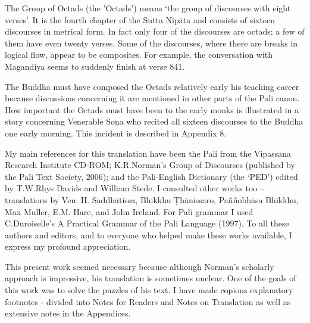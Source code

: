 
The Group of Octads (the 'Octads') means ‘the group of discourses with eight verses’. It is the fourth chapter of the Sutta Nipāta and consists of sixteen discourses in metrical form. In fact only four of the discourses are octads; a few of them have even twenty verses. Some of the discourses, where there are breaks in logical flow, appear to be composites. For example, the conversation with Magandiya seems to suddenly finish at verse 841. 

The Buddha must have composed the Octads relatively early his teaching career because discussions concerning it are mentioned in other parts of the Pali canon. How important the Octads must have been to the early monks is illustrated in a story concerning Venerable Soṇa who recited all sixteen discourses to the Buddha one early morning. This incident is described in Appendix 8.

My main references for this translation have been the Pali from the Vipassana Research Institute CD-ROM; K.R.Norman’s Group of Discourses (published by the Pali Text Society, 2006); and the Pali-English Dictionary (the ‘PED’) edited by T.W.Rhys Davids and William Stede. I consulted other works too – translations by Ven. H. Saddhātissa, Bhikkhu Ṭhānissaro, Paññobhāsa Bhikkhu, Max Muller, E.M. Hare, and John Ireland. For Pali grammar I used C.Duroiselle’s A Practical Grammar of the Pali Language (1997). To all these authors and editors, and to everyone who helped make these works available, I express my profound appreciation.

This present work seemed necessary because although Norman’s scholarly approach is impressive, his translation is sometimes unclear. One of the goals of this work was to solve the puzzles of his text. I have made copious explanatory footnotes - divided into Notes for Readers and Notes on Translation as well as extensive notes in the Appendices.
